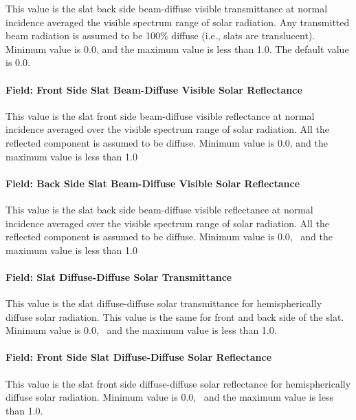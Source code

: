 This value is the slat back side beam-diffuse visible transmittance at normal incidence averaged the visible spectrum range of solar radiation. Any transmitted beam radiation is assumed to be 100\% diffuse (i.e., slats are translucent). Minimum value is 0.0, and the maximum value is less than 1.0. The default value is 0.0.

\paragraph{Field: Front Side Slat Beam-Diffuse Visible Solar Reflectance}\label{field-front-side-slat-beam-diffuse-visible-solar-reflectance}

This value is the slat front side beam-diffuse visible reflectance at normal incidence averaged over the visible spectrum range of solar radiation. All the reflected component is assumed to be diffuse. Minimum value is 0.0, and the maximum value is less than 1.0

\paragraph{Field: Back Side Slat Beam-Diffuse Visible Solar Reflectance}\label{field-back-side-slat-beam-diffuse-visible-solar-reflectance}

This value is the slat back side beam-diffuse visible reflectance at normal incidence averaged over the visible spectrum range of solar radiation. All the reflected component is assumed to be diffuse. Minimum value is 0.0,~ and the maximum value is less than 1.0

\paragraph{Field: Slat Diffuse-Diffuse Solar Transmittance}\label{field-slat-diffuse-diffuse-solar-transmittance}

This value is the slat diffuse-diffuse solar transmittance for hemispherically diffuse solar radiation. This value is the same for front and back side of the slat.~ Minimum value is 0.0,~ and the maximum value is less than 1.0.

\paragraph{Field: Front Side Slat Diffuse-Diffuse Solar Reflectance}\label{field-front-side-slat-diffuse-diffuse-solar-reflectance}

This value is the slat front side diffuse-diffuse solar reflectance for hemispherically diffuse solar radiation. Minimum value is 0.0,~ and the maximum value is less than 1.0.

